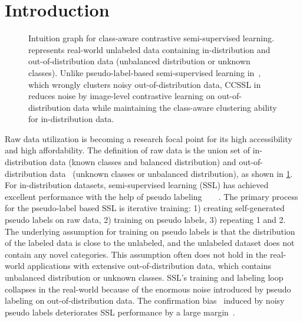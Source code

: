 \documentclass[10pt,twocolumn,letterpaper]{article}
\begin{document}
\section{Introduction}

\begin{figure}
\centering
\begin{minipage}[b]{1.0\linewidth}
    \centering
\end{minipage} 

\medskip
\begin{minipage}[b]{1.0\linewidth}
    \centering
\end{minipage}


\caption{Intuition graph for class-aware contrastive semi-supervised learning.~ represents real-world unlabeled data containing in-distribution and out-of-distribution data (unbalanced distribution or unknown classes). Unlike pseudo-label-based semi-supervised learning in~, which wrongly clusters noisy out-of-distribution data, CCSSL in~ reduces noise by image-level contrastive learning on out-of-distribution data while maintaining the class-aware clustering ability for in-distribution data.}
\label{fig:intuitive}
\end{figure}

\label{sec:intro}
Raw data utilization is becoming a research focal point for its high accessibility and high affordability. The definition of raw data is the union set of in-distribution data (known classes and balanced distribution) and out-of-distribution data~\cite{xu2021stable} (unknown classes or unbalanced distribution), as shown in \cref{fig:intuitive}. For in-distribution datasets, semi-supervised learning (SSL) has achieved excellent performance with the help of pseudo labeling~\cite{sohn2020fixmatch}~\cite{berthelot2019mixmatch}~\cite{berthelot2019remixmatch}~\cite{hu2021simple}. The primary process for the pseudo-label based SSL is iterative training: 1) creating self-generated pseudo labels on raw data, 2) training on pseudo labels, 3) repeating 1 and 2. The underlying assumption for training on pseudo labels is that the distribution of the labeled data is close to the unlabeled, and the unlabeled dataset does not contain any novel categories. This assumption often does not hold in the real-world applications with extensive out-of-distribution data, which contains unbalanced distribution or unknown classes. SSL's training and labeling loop collapses in the real-world because of the enormous noise introduced by pseudo labeling on out-of-distribution data. The confirmation bias~\cite{arazo2020pseudo} induced by noisy pseudo labels deteriorates SSL performance by a large margin~\cite{su2021realistic}.
\end{document}
